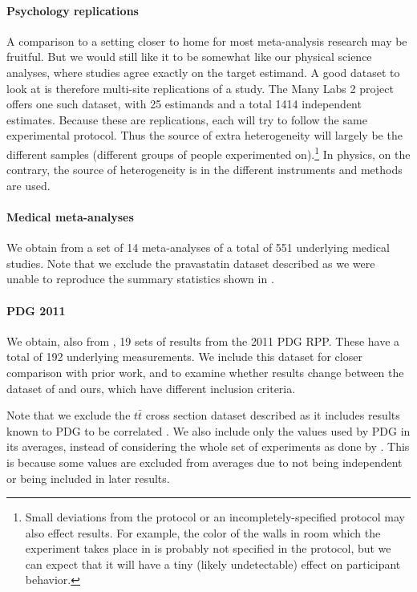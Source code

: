 \documentclass[12pt]{article}
\begin{document}
\paragraph{Psychology replications} A comparison to a setting closer to home for most meta-analysis research may be fruitful. But we would still like it to be somewhat like our physical science analyses, where studies agree exactly on the target estimand. A good dataset to look at is therefore multi-site replications of a study. The Many Labs 2 project \citep{klein2018many} offers one such dataset, with 25 estimands and a total 1414 independent estimates. Because these are replications, each will try to follow the same experimental protocol. Thus the source of extra heterogeneity will largely be the different samples (different groups of people experimented on).\footnote{Small deviations from the protocol or an incompletely-specified protocol may also effect results. For example, the color of the walls in room which the experiment takes place in is probably not specified in the protocol, but we can expect that it will have a tiny (likely undetectable) effect on participant behavior.} In physics, on the contrary, the source of heterogeneity is in the different instruments and methods are used.


\paragraph{Medical meta-analyses} We obtain from \citet{baker2013meta} a set of 14 meta-analyses of a total of 551 underlying medical studies. Note that we exclude the pravastatin dataset described as we were unable to reproduce the summary statistics shown in \citet{baker2013meta}.

\paragraph{PDG 2011} We obtain, also from \citet{baker2013meta}, 19 sets of results from the 2011 PDG RPP. These have a total of 192 underlying measurements. We include this dataset for closer comparison with prior work, and to examine whether results change between the dataset of \citeauthor{baker2013meta} and ours, which have different inclusion criteria.

Note that we exclude the $t\bar{t}$ cross section dataset described as it includes results known to PDG to be correlated \citep{pdg2011topquark}. We also include only the values used by PDG in its averages, instead of considering the whole set of experiments as done by \citet{baker2013meta}. This is because some values are excluded from averages due to not being independent or being included in later results.
\end{document}
